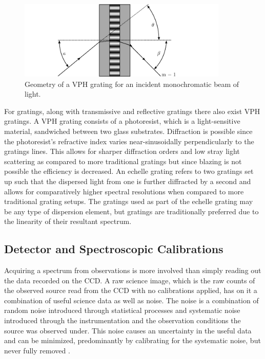 \begin{figure}[t]
    \centering
    \includegraphics[width = 10cm]{figures/2_vph_grating.pdf}
    \caption{Geometry of a \gls{VPH} grating for an incident monochromatic beam of light.}
    \label{fig:vph_grating}
\end{figure}

For gratings, along with transmissive and reflective gratings there also exist \gls{VPH} gratings. A \gls{VPH} grating consists of a photoresist, which is a light-sensitive material, sandwiched between two glass substrates. Diffraction is possible since the photoresist's refractive index varies near-sinusoidally perpendicularly to the gratings lines. This allows for sharper diffraction orders and low stray light scattering as compared to more traditional gratings but since blazing is not possible the efficiency is decreased. An echelle grating refers to two gratings set up such that the dispersed light from one is further diffracted by a second and allows for comparatively higher spectral resolutions when compared to more traditional grating setups. The gratings used as part of the echelle grating may be any type of dispersion element, but gratings are traditionally preferred due to the linearity of their resultant spectrum.
\prgph

\subsection{Detector and Spectroscopic Calibrations}\label{subsec:calibration}

Acquiring a spectrum from observations is more involved than simply reading out the data recorded on the \gls{CCD}. A raw science image, which is the raw counts of the observed source read from the \gls{CCD} with no calibrations applied, has on it a combination of useful science data as well as noise. The noise is a combination of random noise introduced through statistical processes and systematic noise introduced through the instrumentation and the observation conditions the source was observed under. This noise causes an uncertainty in the useful data and can be minimized, predominantly by calibrating for the systematic noise, but never fully removed \citep{CCDhandbook}.
\prgph

